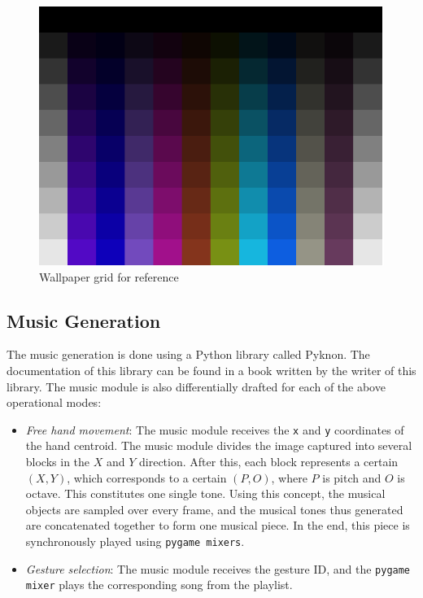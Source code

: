 \documentclass[letterpaper, 10 pt, twoside, conference]{ieeeconf}
\begin{document}
  \begin{figure}[h]
    \centering
    \includegraphics[width=\columnwidth]{wallpaper.png}
    \caption{Wallpaper grid for reference}
    \label{Overall1}
  \end{figure}
\subsection{Music Generation}
  The music generation is done using a Python library called Pyknon. The documentation of this library can be found
  in a book written by the writer of this library. The music module is also differentially drafted for each 
  of the above operational modes:
  \begin{itemize}
    \item \textit{Free hand movement}: The music module receives the \texttt{x} and \texttt{y} coordinates
      of the hand centroid. The music module divides the image captured into several blocks in the $X$ and $Y$
      direction. After this, each block represents a certain $(X,Y)$, which corresponds to a certain $(P,O)$,
      where $P$ is pitch and $O$ is octave. This constitutes one single tone.
      Using this concept, the musical objects are sampled over every frame, and the musical tones thus generated are
      concatenated together to form one musical piece. In the end, this piece is synchronously played using
      \texttt{pygame mixers}.
      \par\null\par
    \item \textit{Gesture selection}: The music module receives the gesture ID, and the \texttt{pygame mixer}
      plays the corresponding song from the playlist.
    \end{itemize}
\end{document}
